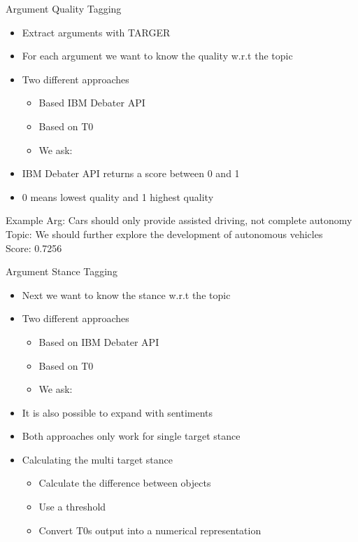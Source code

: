 \documentclass[english]{mlutalk}
\begin{document}
\begin{frame}{Argument Quality Tagging}
    \begin{itemize}
        \item Extract arguments with TARGER~\cite{ChernodubOHBHBP2019}
        \item For each argument we want to know the quality w.r.t the topic
        \item Two different approaches
        \begin{itemize}
            \item Based IBM Debater API~\cite{ToledoG2019}
            \item Based on T0
            \item We ask: 
        \end{itemize}
        \item IBM Debater API returns a score between 0 and 1
        \item 0 means lowest quality and 1 highest quality
    \end{itemize}
    \begin{block}{Example}
        Arg: Cars should only provide assisted driving, not complete autonomy\\
        Topic: We should further explore the development of autonomous vehicles\\ 
        Score: 0.7256
    \end{block}
\end{frame}

\begin{frame}{Argument Stance Tagging}
    \begin{itemize}
        \item Next we want to know the stance w.r.t the topic
        \item Two different approaches
        \begin{itemize}
            \item Based on IBM Debater API~\cite{BarHaimBDSS2017}
            \item Based on T0
            \item We ask: 
        \end{itemize}
        \item It is also possible to expand with sentiments
        \item Both approaches only work for single target stance
        \item Calculating the multi target stance
        \begin{itemize}
            \item Calculate the difference between objects
            \item Use a threshold
            \item Convert T0s output into a numerical representation
        \end{itemize}
    \end{itemize}
\end{frame}
\end{document}
